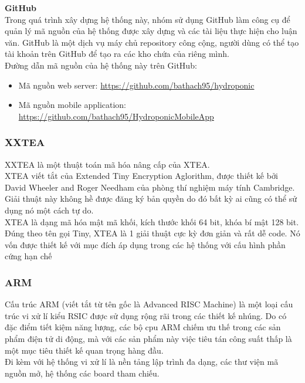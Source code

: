 \documentclass[a4paper,12pt,oneside]{article}
\begin{document}
\noindent \textbf{GitHub}\\
Trong quá trình xây dựng hệ thống này, nhóm sử dụng GitHub làm công cụ để quản lý mã nguồn của hệ
thống được xây dựng và các tài liệu thực hiện cho luận văn. GitHub là một dịch vụ máy chủ
repository công cộng, người dùng có thể tạo tài khoản trên GitHub để tạo ra các kho chứa của riêng mình.\\
Đường dẫn mã nguồn của hệ thống này trên GitHub:
\begin{itemize}
\item Mã nguồn web server: \href{https://github.com/bathach95/hydroponic}{https://github.com/bathach95/hydroponic}
\item Mã nguồn mobile application: \href{https://github.com/bathach95/HydroponicMobileApp}{https://github.com/bathach95/HydroponicMobileApp}
\end{itemize}

\subsubsection{XXTEA}
\noindent XXTEA là một thuật toán mã hóa nâng cấp của XTEA.\\
\noindent XTEA viết tắt của Extended Tiny Encryption Aglorithm, được thiết kế bởi David Wheeler and Roger Needham của phòng thí nghiệm máy tính Cambridge. Giải thuật này không hề được đăng ký bản quyền do đó bất kỳ ai cũng có thể sử dụng nó một cách tự do. \\ 
\noindent XTEA là dạng mã hóa mật mã khối, kích thước khối 64 bit, khóa bí mật 128 bit. \\
\noindent Đúng theo tên gọi Tiny, XTEA là 1 giải thuật cực kỳ đơn giản và rất dễ code. Nó vốn được thiết kế với mục đích áp dụng trong các hệ thống với cấu hình phần cứng hạn chế 

\subsubsection{ARM}
\noindent Cấu trúc ARM (viết tắt từ tên gốc là Advanced RISC Machine) là một loại cấu trúc vi xử lí kiểu RSIC được sử dụng rộng rãi trong các thiết kế nhúng. Do có đặc điểm tiết kiệm năng lượng, các bộ cpu ARM chiếm ưu thế trong các sản phẩm điện tử di động, mà với các sản phẩm này việc tiêu tán công suất thấp là một mục tiêu thiết kế quan trọng hàng đầu.\\
\noindent Đi kèm với hệ thống vi xử lí là nền tảng lập trình đa dạng, các thư viện mã nguồn mở, hệ thống các board tham chiếu.
\end{document}
